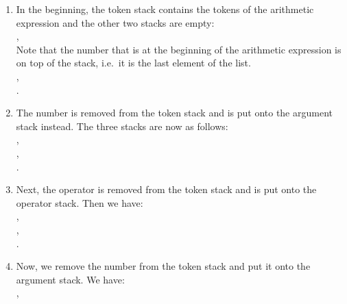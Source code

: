 \begin{enumerate}
\item In the beginning, the token stack contains the tokens of the arithmetic expression and the other two stacks
      are empty: \\[0.2cm]
      \hspace*{1.3cm} 
      , 
      \\[0.2cm]
      Note that the number that is at the beginning of the arithmetic expression is on top of the
      stack, i.e.~it is the last element of the list.  \\[0.2cm]
      \hspace*{1.3cm} , \\[0.2cm]
      \hspace*{1.3cm} . 
\item The number  is removed from the token stack and is put onto the argument stack
      instead.  The three stacks are now as follows: \\[0.2cm]
      \hspace*{1.3cm} , \\[0.2cm]
      \hspace*{1.3cm} , \\[0.2cm]
      \hspace*{1.3cm} . 
\item Next, the operator  is removed from the token stack and is put
      onto the operator stack.  Then we have: \\[0.2cm]
      \hspace*{1.3cm} , \\[0.2cm]
      \hspace*{1.3cm} , \\[0.2cm]
      \hspace*{1.3cm} . 
\item Now, we remove the number  from the  token stack and put it onto the argument stack.
      We have: \\[0.2cm]
      \hspace*{1.3cm} , \\[0.2cm]

\end{enumerate}
